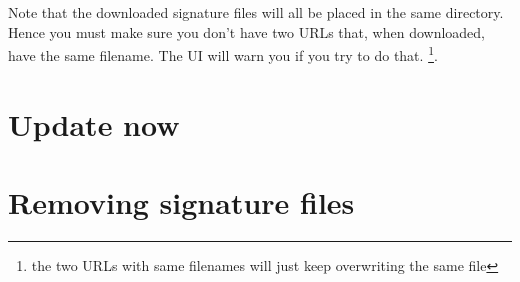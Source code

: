 Note that the downloaded signature files will all be placed in the same directory. Hence you must make sure you don't have two URLs that, when downloaded, have the same filename. The UI will warn you if you try to do that. \footnote{the two URLs with same filenames will just keep overwriting the same file}.
\section{Update now}
\label{sec:updatenow}

\section{Removing signature files}
\label{sec:localremove}
